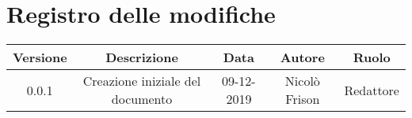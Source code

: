 \section*{Registro delle modifiche}

\begin{center}
	\begin{longtable}{|c|c|c|c|c|}
	\hline
	\rowcolor{lighter-grayer}
	\textbf{Versione} & \textbf{Descrizione} & \textbf{Data} & \textbf{Autore} & \textbf{Ruolo} \\
	\hline
	\endfirsthead


	\hline
	0.0.1 & Creazione iniziale del documento & 09-12-2019 & Nicolò Frison & Redattore \\
	\hline

	\end{longtable}
\end{center}